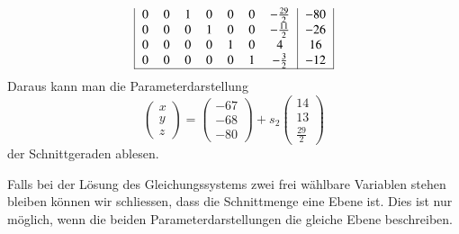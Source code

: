 \begin{beispiel}
\[\begin{tabular}{|
>{$}c<{$}
>{$}c<{$}
>{$}c<{$}
>{$}c<{$}
>{$}c<{$}
>{$}c<{$}
>{$}c<{$}|
>{$}c<{$}|}
0&0&1&0&0&0&-\frac{29}2&-80\\
0&0&0&1&0&0&-\frac{11}2&-26\\
0&0&0&0&1&0&4          & 16\\
0&0&0&0&0&1&-\frac{3}2 &-12\\
\hline
\end{tabular}
\]
Daraus kann man die Parameterdarstellung
\[
\begin{pmatrix} x\\y\\z\end{pmatrix}
=
\begin{pmatrix}-67\\-68\\-80\end{pmatrix}
+s_2\begin{pmatrix}14\\13\\\frac{29}2\end{pmatrix}
\]
der Schnittgeraden ablesen.
\end{beispiel}

Falls bei der Lösung des Gleichungssystems zwei frei wählbare Variablen stehen
bleiben können wir schliessen, dass die Schnittmenge eine Ebene ist.
Dies ist nur möglich, wenn die beiden Parameterdarstellungen die
gleiche Ebene beschreiben.

